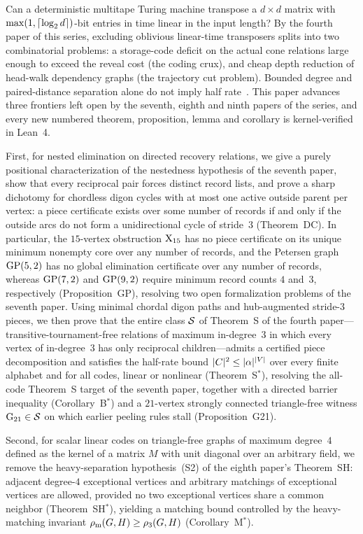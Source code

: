 Can a deterministic multitape Turing machine transpose a $d \times d$ matrix with $\max(1, \lceil \log_2 d \rceil)$-bit entries in time
linear in the input length? By the fourth paper of this series, excluding oblivious linear-time transposers splits into two
combinatorial problems: a storage-code deficit on the actual cone relations large enough to exceed the reveal cost
(the coding crux), and cheap depth reduction of head-walk dependency graphs (the trajectory cut problem).
Bounded degree and paired-distance separation alone do not imply half rate~\cite{StorageCodes2026}.
This paper advances three
frontiers left open by the seventh, eighth and ninth papers of the series, and every new numbered theorem, proposition,
lemma and corollary is kernel-verified in Lean~4.

First, for nested elimination on directed recovery relations, we give a purely positional characterization of the
nestedness hypothesis of the seventh paper, show that every reciprocal pair forces distinct record lists, and prove a
sharp dichotomy for chordless digon cycles with at most one active outside parent per vertex: a piece certificate exists
over some number of records if and only if the outside arcs do not form a unidirectional cycle of stride~$3$
(Theorem~DC). In particular, the $15$-vertex obstruction $\mathrm{X}_{15}$ has no piece certificate on its unique minimum nonempty
core over any number of records, and the Petersen graph $\operatorname{GP}(5,2)$ has no global elimination certificate over any number
of records, whereas $\operatorname{GP}(7,2)$ and $\operatorname{GP}(9,2)$ require minimum record counts $4$ and~$3$, respectively (Proposition~GP),
resolving two open formalization problems of the seventh paper. Using minimal chordal digon paths and hub-augmented
stride-$3$ pieces, we then prove that the entire class $\mathcal{S}$ of Theorem~S of the fourth paper---transitive-tournament-free
relations of maximum in-degree~$3$ in which every vertex of in-degree~$3$ has only reciprocal children---admits a
certified piece decomposition and satisfies the half-rate bound $\lvert C \rvert^2 \le \lvert \alpha \rvert^{\lvert V \rvert}$ over every
finite alphabet and for all codes, linear or nonlinear (Theorem~S$^*$), resolving the all-code Theorem~S target of the
seventh paper, together with a directed barrier inequality (Corollary~B$^*$) and a $21$-vertex strongly connected
triangle-free witness $\mathrm{G}_{21} \in \mathcal{S}$ on which earlier peeling rules stall (Proposition~G21).

Second, for scalar linear codes on triangle-free graphs of maximum degree~$4$ defined as the kernel of a matrix $M$ with
unit diagonal over an arbitrary field, we remove the heavy-separation hypothesis~(S2) of the eighth paper's Theorem~SH:
adjacent degree-$4$ exceptional vertices and arbitrary matchings of exceptional vertices are allowed, provided no two
exceptional vertices share a common neighbor (Theorem~SH$^*$), yielding a matching bound controlled by the heavy-matching
invariant $\rho_{\mathrm{m}}(G,H) \ge \rho_3(G,H)$ (Corollary~M$^*$).

